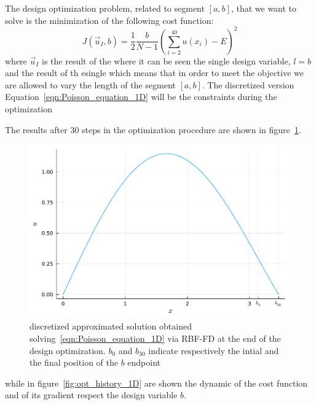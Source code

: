 The design optimization problem, related to segment $[a,b]$, that we want to solve is the minimization of the following cost function:
\begin{equation}
	J(\vec{u}_I, b) = \frac{1}{2} \frac{b}{N-1} \left( \sum_{i=2}^{40} u(x_i) - E \right)^2
\end{equation}
where $\vec{u}_I$ is the result of the 
where it can be seen the single design variable, $l=b$ and the result of th esingle  which means that in order to meet the objective we are allowed to vary the length of the segment $[a,b]$.
The discretized version Equation~\eqref{eqn:Poisson_equation_1D} will be the constraints during the optimization

The results after $30$ steps in the optimization procedure are shown in figure~\ref{fig:opt_results_1D}.

\begin{figure}
	\centering
	\includegraphics[width=.75\textwidth]{img/uOpt_vs_x_1D.pdf}
	\caption{discretized approximated solution obtained solving~\eqref{eqn:Poisson_equation_1D} via RBF-FD at the end of the design optimization. $b_0$ and $b_{30}$ indicate respectively the intial and the final position of the $b$ endpoint}
	\label{fig:opt_results_1D}
\end{figure}

while in figure~\ref{fig:opt_history_1D} are shown the dynamic of the cost function and of its gradient respect the design variable $b$.

